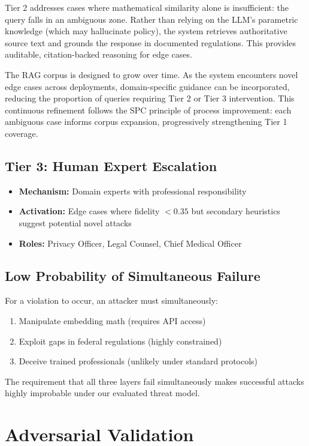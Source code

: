 \documentclass[11pt,a4paper]{article}
\begin{document}
Tier 2 addresses cases where mathematical similarity alone is insufficient: the query falls in an ambiguous zone. Rather than relying on the LLM's parametric knowledge (which may hallucinate policy), the system retrieves authoritative source text and grounds the response in documented regulations. This provides auditable, citation-backed reasoning for edge cases.

The RAG corpus is designed to grow over time. As the system encounters novel edge cases across deployments, domain-specific guidance can be incorporated, reducing the proportion of queries requiring Tier 2 or Tier 3 intervention. This continuous refinement follows the SPC principle of process improvement: each ambiguous case informs corpus expansion, progressively strengthening Tier 1 coverage.

\subsection{Tier 3: Human Expert Escalation}

\begin{itemize}
\item \textbf{Mechanism:} Domain experts with professional responsibility
\item \textbf{Activation:} Edge cases where fidelity $< 0.35$ but secondary heuristics suggest potential novel attacks
\item \textbf{Roles:} Privacy Officer, Legal Counsel, Chief Medical Officer
\end{itemize}

\subsection{Low Probability of Simultaneous Failure}

For a violation to occur, an attacker must simultaneously:
\begin{enumerate}
\item Manipulate embedding math (requires API access)
\item Exploit gaps in federal regulations (highly constrained)
\item Deceive trained professionals (unlikely under standard protocols)
\end{enumerate}

The requirement that all three layers fail simultaneously makes successful attacks highly improbable under our evaluated threat model.

\section{Adversarial Validation}
\label{sec:validation}
\end{document}
